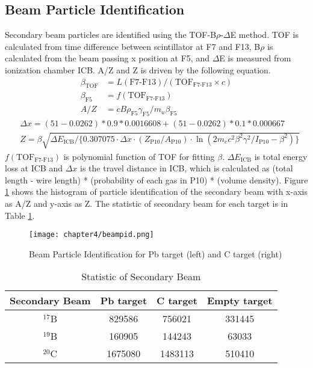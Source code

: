 \subsection{Beam Particle Identification}
Secondary beam particles are identified using the TOF-B$\rho$-$\Delta$E method. TOF is calculated from time difference between scintillator at F7 and F13, B$\rho$ is calculated from the beam passing x position at F5, and $\Delta$E is measured from ionization chamber ICB. A/Z and Z is driven by the following equation.
\begin{align}
    \beta_{\text{TOF}} &= L(\text{F7-F13}) / ( {\text{TOF}}_{\text{F7-F13}} \times c )\\
    \beta_{\text{F5}} &= f(\text{TOF}_{\text{F7-F13}})\\
    A/Z &= c B\rho_{\text{F5}} \gamma_{\text{F5}} / m_u \beta_{\text{F5}}
\end{align}
\begin{align}
    &\Delta x = (51-0.0262)*0.9*0.0016608 + (51-0.0262)*0.1*0.000667 \\
    &Z = \beta \sqrt{\Delta E_{\text{ICB}}/\{0.307075 \cdot \Delta x \cdot (Z_{\text{P10}}/A_{\text{P10}}) \cdot \ln( 2m_{e}c^{2}\beta^{2}\gamma^{2}/I_{\text{P10}} - \beta^{2})\}}
\end{align}
 $f(\text{TOF}_{\text{F7-F13}})$ is polynomial function of TOF for fitting $\beta$. $\Delta E_{\text{ICB}}$ is total energy loss at ICB and $\Delta x$ is the travel distance in ICB, which is calculated as (total length - wire length) * (probability of each gas in P10) * (volume density).
Figure \ref{fig:Beam_PID} shows the histogram of particle identification of the secondary beam with x-axis as A/Z and y-axis as Z. The statistic of secondary beam for each target is in Table \ref{tab:Beam_PID}.

\begin{figure}[h]
    \centering
    \texttt{[image: chapter4/beampid.png]}
    \caption[Secondary Beam Particle Identification]{Beam Particle Identification for Pb target (left) and C target (right)}
    \label{fig:Beam_PID}
\end{figure}

\begin{table}[h]
    \centering
    \begin{tabular}{cccc}
        \hline
        Secondary Beam & Pb target & C target & Empty target\\             
        \hline \hline
        ${}^{17}$B & 829586 & 756021 & 331445 \\
        ${}^{19}$B &  160905&  144243&  63033\\
        ${}^{20}$C &  1675080 & 1483113 & 510410 \\
        \hline
    \end{tabular}
    \caption{Statistic of Secondary Beam}
    \label{tab:Beam_PID}
\end{table}

